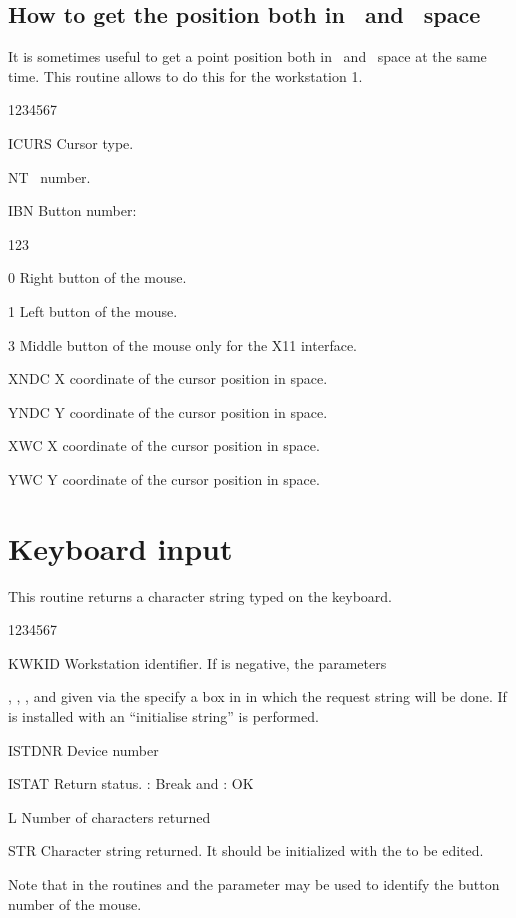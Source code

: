 \subsection{How to get the position both in \NDC~and \WC~space}
\Action
It is sometimes useful to get a point position both in \NDC~and \WC~space
at the same time. This routine allows to do this for the workstation 1.
\begin{DLtt}{1234567}
\item[ICURS] Cursor type.
\item[NT] \NT~number.
\item[IBN] Button number:
\begin{DLtt}{123}
\item[0] Right button of the mouse.
\item[1] Left button of the mouse.
\item[3] Middle button of the mouse only for the X11 interface.
\end{DLtt}
\item[XNDC] X coordinate of the cursor position in \NDC{} space.
\item[YNDC] Y coordinate of the cursor position in \NDC{} space.
\item[XWC] X coordinate of the cursor position in \WC{} space.
\item[YWC] Y coordinate of the cursor position in \WC{} space.
\end{DLtt}
 
\clearpage
 
\section{Keyboard input}
\Action
This routine returns a character string typed on the keyboard.
\Pdesc
\begin{DLtt}{1234567}
\item[KWKID]  Workstation identifier. If  is negative, the 
              parameters \par {}, , ,
              and  given via the  specify
              a box in \NDC{} in which the request string will be done. 
              If \HIGZ{} is installed with \GKS{} an ``initialise string''
              is performed.
\item[ISTDNR] Device number
\item[ISTAT]  Return status. : Break and : OK
\item[L]      Number of characters returned
\item[STR]    Character string returned. It should be initialized with the
              to be edited.
\end{DLtt}
\par
Note that in the routines  and  the parameter 
 may be used to identify the button number of the mouse.

